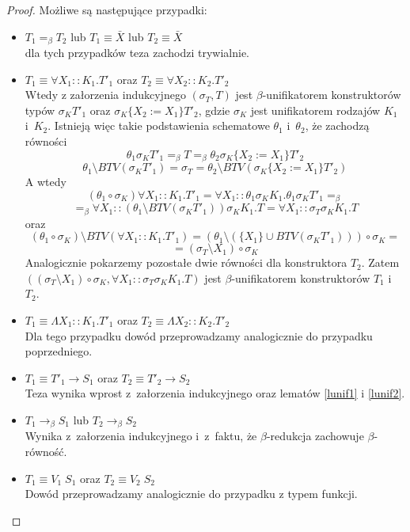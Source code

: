 \documentclass[11pt,leqno]{article}
\begin{document}
\begin{proof}
Możliwe są następujące przypadki:
\begin{itemize}
\item $T_1 =_\beta T_2$ lub $T_1 \equiv \bar{X}$ lub $T_2 \equiv \bar{X}$ \\
dla tych przypadków teza zachodzi trywialnie.
\item $T_1 \equiv \forall X_1::K_1.T'_1$ oraz $T_2 \equiv \forall X_2::K_2.T'_2$ \\
Wtedy z załorzenia indukcyjnego $(\sigma_T, T)$ jest $\beta$-unifikatorem konstruktorów typów
$\sigma_K T'_1$ oraz $\sigma_K\{X_2:=X_1\}T'_2$, gdzie $\sigma_K$ jest unifikatorem rodzajów $K_1$ i~$K_2$.
Istnieją więc takie podstawienia schematowe $\theta_1$ i~$\theta_2$, że zachodzą równości
\[
\theta_1 \sigma_K T'_1 =_\beta T =_\beta \theta_2 \sigma_K \{X_2:=X_1\} T'_2
\]
\[
\theta_1 \setminus BTV(\sigma_K T'_1) = \sigma_T = \theta_2 \setminus BTV(\sigma_K \{X_2:=X_1\} T'_2)
\]
A wtedy
\[
(\theta_1 \circ \sigma_K)\forall X_1::K_1.T'_1 = \forall X_1::\theta_1\sigma_K K_1. \theta_1\sigma_K T'_1 =_\beta
\]
\[
=_\beta \forall X_1::(\theta_1 \setminus BTV(\sigma_K T'_1))\sigma_K K_1.T = \forall X_1::\sigma_T\sigma_K K_1.T
\]
oraz
\[
(\theta_1 \circ \sigma_K) \setminus BTV(\forall X_1::K_1.T'_1) = (\theta_1 \setminus (\{X_1\} \cup BTV(\sigma_K T'_1))) \circ \sigma_K =
\]
\[
= (\sigma_T \setminus X_1) \circ \sigma_K
\]
Analogicznie pokarzemy pozostałe dwie równości dla konstruktora $T_2$. Zatem 
\mbox{$((\sigma_T \setminus X_1) \circ \sigma_K, \forall X_1::\sigma_T \sigma_K K_1.T)$} jest $\beta$-unifikatorem konstruktorów $T_1$ i~$T_2$.
\item $T_1 \equiv \Lambda X_1::K_1.T'_1$ oraz $T_2 \equiv \Lambda X_2::K_2.T'_2$ \\
Dla tego przypadku dowód przeprowadzamy analogicznie do przypadku poprzedniego.
\item $T_1 \equiv T'_1 \rightarrow S_1$ oraz $T_2 \equiv T'_2 \rightarrow S_2$ \\
Teza wynika wprost z~załorzenia indukcyjnego oraz lematów \ref{lunif1} i \ref{lunif2}.
\item $T_1 \longrightarrow_\beta S_1$ lub $T_2 \longrightarrow_\beta S_2$ \\
Wynika z~załorzenia indukcyjnego i~z~faktu, że $\beta$-redukcja zachowuje $\beta$-równość.
\item $T_1 \equiv V_1\;S_1$ oraz $T_2 \equiv V_2\;S_2$ \\
Dowód przeprowadzamy analogicznie do przypadku z typem funkcji.
\end{itemize}
\end{proof}
\end{document}
